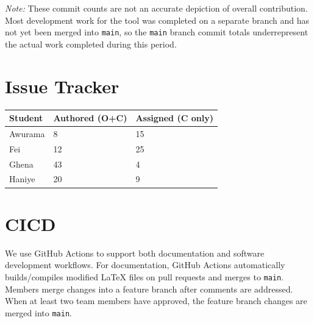 \documentclass{article}
\begin{document}
\noindent\textit{Note:} These commit counts are not an accurate depiction
of overall contribution. Most development work for the tool
was completed on a separate branch and has not yet been merged
into \texttt{main}, so the \texttt{main} branch commit totals
underrepresent the actual work completed during this period.

\section{Issue Tracker}


\begin{table}[H]
\centering
\begin{tabular}{lll}
\toprule
\textbf{Student} & \textbf{Authored (O+C)} & \textbf{Assigned (C only)}\\
\midrule
Awurama & 8 & 15 \\
Fei & 12 & 25 \\
Ghena & 43 & 4 \\
Haniye & 20 & 9 \\
\bottomrule
\end{tabular}
\end{table}


\section{CICD}

We use GitHub Actions to support both documentation
and software development workflows. For documentation,
GitHub Actions automatically builds/compiles modified
\LaTeX{} files on pull requests and merges to \texttt{main}.
Members merge changes into a feature branch after comments
are addressed. When at least two team members have approved,
the feature branch changes are merged into \texttt{main}.\\
\end{document}

